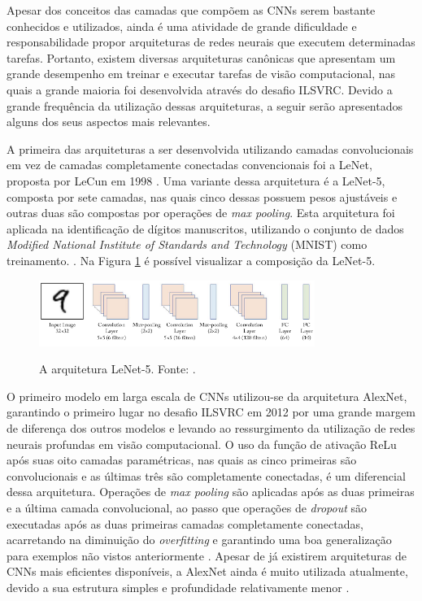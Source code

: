 Apesar dos conceitos das camadas que compõem as CNNs serem bastante conhecidos e utilizados, ainda é uma atividade de grande dificuldade e responsabilidade propor arquiteturas de redes neurais que executem determinadas tarefas. Portanto, existem diversas arquiteturas canônicas que apresentam um grande desempenho em treinar e executar tarefas de visão computacional, nas quais a grande maioria foi desenvolvida através do desafio ILSVRC. Devido a grande frequência da utilização dessas arquiteturas, a seguir serão apresentados alguns dos seus aspectos mais relevantes.

A primeira das arquiteturas a ser desenvolvida utilizando camadas convolucionais em vez de camadas completamente conectadas convencionais foi a LeNet, proposta por LeCun em 1998 \cite{lecun}. Uma variante dessa arquitetura é a LeNet-5, composta por sete camadas, nas quais cinco dessas possuem pesos ajustáveis e outras duas são compostas por operações de \emph{max pooling}. Esta arquitetura foi aplicada na identificação de dígitos manuscritos, utilizando o conjunto de dados \emph{Modified National Institute of Standards and Technology} (MNIST) como treinamento. \cite{khan}. Na Figura \ref{fig:lenet} é possível visualizar a composição da LeNet-5.

\begin{figure}[h!]
  \centering
  \caption{A arquitetura LeNet-5. Fonte: \cite{khan}.}
  \includegraphics[width=0.8\textwidth]{imgs/lenet5}
  \label{fig:lenet}
\end{figure}

O primeiro modelo em larga escala de CNNs utilizou-se da arquitetura AlexNet, garantindo o primeiro lugar no desafio ILSVRC em 2012 por uma grande margem de diferença dos outros modelos e levando ao ressurgimento da utilização de redes neurais profundas em visão computacional. O uso da função de ativação ReLu após suas oito camadas paramétricas, nas quais as cinco primeiras são convolucionais e as últimas três são completamente conectadas, é um diferencial dessa arquitetura. Operações de \emph{max pooling} são aplicadas após as duas primeiras e a última camada convolucional, ao passo que operações de \emph{dropout} são executadas após as duas primeiras camadas completamente conectadas, acarretando na diminuição do \emph{overfitting} e garantindo uma boa generalização para exemplos não vistos anteriormente \cite{khan}. Apesar de já existirem arquiteturas de CNNs mais eficientes disponíveis, a AlexNet ainda é muito utilizada atualmente, devido a sua estrutura simples e profundidade relativamente menor \cite{sewak}.

